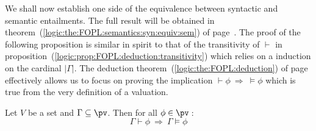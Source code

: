 We shall now establish one side of the equivalence between syntactic
and semantic entailments. The full result will be obtained in
theorem~(\ref{logic:the:FOPL:semantics:syn:equiv:sem}) of
page~\pageref{logic:the:FOPL:semantics:syn:equiv:sem}. The proof of
the following proposition is similar in spirit to that of the
transitivity of $\vdash$ in
proposition~(\ref{logic:prop:FOPL:deduction:transitivity}) which
relies on a induction on the cardinal $|\Gamma|$. The deduction
theorem~(\ref{logic:the:FOPL:deduction}) of
page~\pageref{logic:the:FOPL:deduction} effectively allows us to
focus on proving the implication $\vdash\phi\ \Rightarrow\
\vDash\phi$ which is true from the very definition of a valuation.

\begin{prop}\label{logic:prop:FOPL:semantics:syn:imp:sem}
Let $V$ be a set and $\Gamma\subseteq\pv$. Then for all
$\phi\in\pv$\,:
    \begin{equation}\label{logic:eqn:FOPL:semantics:syn:imp:sem:1}
    \Gamma\vdash\phi\ \Rightarrow\ \Gamma\vDash\phi
    \end{equation}
\end{prop}
